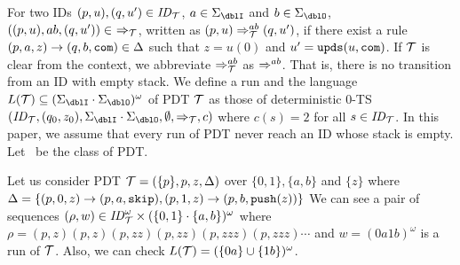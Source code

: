 For two IDs $(p, u), (q, u')\in \mathit{ID}_{\cal T}$,
$a\in\Sigma_\dblI$ and $b\in\Sigma_\dblO$,
$((p, u), ab, (q, u'))\in\ \Rightarrow_\calT$,
written as $(p, u) \Rightarrow_{{\cal T}}^{ab} (q, u')$,
if there exist a rule $(p, a, z) \rightarrow (q, b, \mathtt{com}) \in \Delta$
such that $z=u(0)$ and $u'=\mathtt{upds}(u,\mathtt{com})$.
If ${\cal T}$ is clear from the context,
we abbreviate
$\Rightarrow_{{\cal T}}^{ab}$ as $\Rightarrow^{ab}$.
That is, there is no transition from an ID with empty stack.
We define a run and the language $L(\calT)\subseteq (\Sigma_\dblI \cdot \Sigma_\dblO)^{\omega}$ of PDT ${\cal T}$ as those of
deterministic $0$-TS $(\ID_\calT, (q_0,z_0), \Sigma_\dblI\cdot\Sigma_\dblO, \emptyset, \Rightarrow_\calT, c)$ where $c(s)=2$ for all $s\in\mathit{ID}_{\cal T}$.
In this paper,
we assume that every run of PDT never reach an ID whose stack is empty.
Let \PDT\ be the class of PDT.

\begin{example}
\label{ex: PDT}
Let us consider PDT
${\cal T} = (\{p\},p,z,\Delta)$
over $\{0,1\},\{a,b\}$ and $\{z\}$ where
$\Delta = \{
(p, 0, z) \rightarrow (p, a, \mathtt{skip}),
(p, 1, z) \rightarrow (p, b, \mathtt{push}(z))
\}$
We can see
a pair of sequences $(\rho,w)\in \mathit{ID}_{\cal T}^\omega\times (\{0,1\}\cdot\{a,b\})^\omega$ where
$\rho=(p,z)(p,z)(p,zz)(p,zz)(p,zzz)(p,zzz)\cdots$
and $w=(0a1b)^\omega$
is a run of ${\cal T}$.
Also, we can check $L({\cal T})=(\{0a\}\cup\{1b\})^\omega$.
\end{example}


